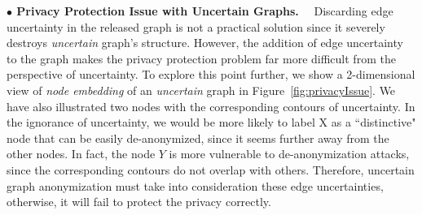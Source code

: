 \vspace{2mm}\hspace{-1em}
\textbf{$\bullet$ Privacy Protection Issue with Uncertain Graphs.}~~
Discarding edge uncertainty in the released graph is not a practical solution since it severely destroys \emph{uncertain} graph's structure. 
However, the addition of edge uncertainty to the graph makes the privacy protection problem far more difficult from the perspective of uncertainty. To explore this point further, we show a 2-dimensional view of \emph{node embedding} of an \emph{uncertain} graph in Figure~\ref{fig:privacyIssue}. We have also illustrated two nodes with the corresponding contours of uncertainty. In the ignorance of uncertainty, we would be more likely to label X as a ``distinctive" node that can be easily de-anonymized, since it seems further away from the other nodes. In fact, the node $Y$ is more vulnerable to de-anonymization attacks, since the corresponding contours do not overlap with others. Therefore, uncertain graph anonymization must take into consideration these edge uncertainties, otherwise, it will fail to protect the privacy correctly. 

 
